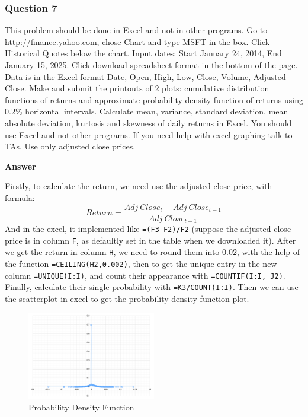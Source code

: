 \documentclass[margin=1in]{article}
\begin{document}
		   \pagebreak
		  \subsubsection*{Question 7}
		   This problem should be done in Excel and not in other programs. Go to http://finance.yahoo.com, chose Chart and type MSFT in the box. Click Historical Quotes below the chart. Input dates: Start January 24, 2014, End January 15, 2025. Click download spreadsheet format in the bottom of the page. Data is in the Excel format Date, Open, High, Low, Close, Volume, Adjusted Close. Make and submit the printouts of 2 plots: cumulative distribution functions of returns and approximate probability density function of returns using $0.2 \%$ horizontal intervals. Calculate mean, variance, standard deviation, mean absolute deviation, kurtosis and skewness of daily returns in Excel. You should use Excel and not other programs. If you need help with excel graphing talk to TAs. Use only adjusted close prices.
		   
		   \textbf{Answer}
		   
		   Firstly, to calculate the return, we need use the adjusted close price, with formula: $$Return=\frac{Adj\ Close_{t}-Adj\ Close_{t-1}}{Adj\ Close_{t-1}}$$
		   And in the excel, it implemented like \texttt{=(F3-F2)/F2} (suppose the adjusted close price is in column \texttt{F}, as defaultly set in the table when we downloaded it). After we get the return in column \texttt{H}, we need to round them into $0.02$, with the help of the function \texttt{=CEILING(H2,0.002)}, then to get the unique entry in the new column \texttt{=UNIQUE(I:I)}, and count their appearance with \texttt{=COUNTIF(I:I, J2)}. Finally, calculate their single probability with \texttt{=K3/COUNT(I:I)}. Then we can use the scatterplot in excel to get the probability density function plot.
		   \begin{figure}[h]
		   	\caption{Probability Density Function}
		   	\centering
		   	\includegraphics[width=0.5\textwidth]{HW1_Q7_1}
		   \end{figure}
	   
\end{document}
